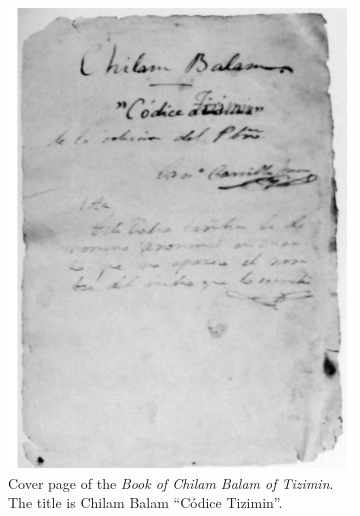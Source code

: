 \documentclass[../main.tex]{subfiles}
\begin{document}
\begin{figure}[ht]
    \centering
    \begin{subfigure}[b]{0.49\textwidth}
        \centering
        \includegraphics[width=\textwidth]{img/chilam-balam-of-tizimin-cover-page}
        \caption{Cover page of the \emph{Book of Chilam Balam of Tizimin}. 
                 The title is Chilam Balam ``C\'odice Tizimin''.}
        \label{fig:introduction-chilam-balam-of-tizimin-cover-page}
    \end{subfigure}
    \hfill
    \begin{subfigure}[b]{0.49\textwidth}
        \centering

\end{subfigure}
\end{figure}
\end{document}
